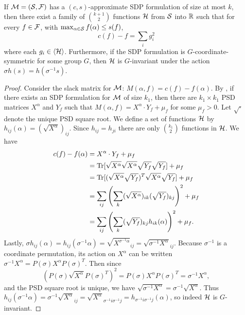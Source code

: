 \begin{lemma}\label{lem:sdptosos}
If $\mathcal M = (\mathcal S, \mathcal F)$ has a $(c,s)$-approximate SDP formulation of size at most $k$, then there exist a family of $\binom{k+1}{2}$ functions $\mathcal H$ from $\mathcal S$ into $\mathbb R$ such that for every $f \in \mathcal F$, with $\max_{\alpha \in \mathcal S} f(\alpha) \leq s(f)$,
\[c(f) - f = \sum_i g_i^2\]
where each $g_i \in \langle \mathcal H \rangle$. Furthermore, if the SDP formulation is $G$-coordinate-symmetric for some group $G$, then $\mathcal H$ is $G$-invariant under the action $\sigma h(s) = h(\sigma^{-1}s)$.
\end{lemma} 
\begin{proof}
Consider the slack matrix for $\mathcal M$: $M(\alpha,f) = c(f) - f(\alpha)$. By , if there exists an SDP formulation for $\mathcal M$ of size $k_1$, then there are $k_1 \times k_1$ PSD matrices $X^\alpha$ and $Y_f$ such that $M(\alpha,f) = X^\alpha \cdot Y_f + \mu_f$ for some $\mu_f > 0$. Let $\sqrt{\cdot}$ denote the unique PSD square root. We define a set of functions $\mathcal H$ by $h_{ij}(\alpha) = (\sqrt{X^\alpha})_{ij}$. Since $h_{ij} = h_{ji}$ there are only $\binom{k_1}{2}$ functions in $\mathcal H$. We have
\begin{align*}
c(f) - f(\alpha) &= X^\alpha \cdot Y_f + \mu_f \\
&= \operatorname{Tr}[\sqrt{X^\alpha}\sqrt{X^\alpha}\sqrt{Y_f}\sqrt{Y_f}] + \mu_f \\
&= \operatorname{Tr}[(\sqrt{X^\alpha}\sqrt{Y_f})^T\sqrt{X^\alpha}\sqrt{Y_f}] + \mu_f \\
&= \sum_{ij} \left(\sum_k (\sqrt{X^\alpha})_{ik}(\sqrt{Y_f})_{kj}\right)^2 + \mu_f \\
&= \sum_{ij} \left(\sum_k (\sqrt{Y_f})_{kj}h_{ik}(\alpha)\right)^2 + \mu_f.
\end{align*}
Lastly, $\sigma h_{ij}(\alpha) = h_{ij}(\sigma^{-1}\alpha) = \sqrt{X^{\sigma^{-1}\alpha}}_{ij} = \sqrt{\sigma^{-1}X^\alpha}_{ij}$. Because $\sigma^{-1}$ is a coordinate permutation, its action on $X^\alpha$ can be written $\sigma^{-1} X^\alpha = P(\sigma) X^\alpha P(\sigma)^T$. Then since 
\[\left(P(\sigma)\sqrt{X^\alpha}P(\sigma)^T\right)^2 = P(\sigma)X^\alpha P(\sigma)^T = \sigma^{-1}X^\alpha,\] 
and the PSD square root is unique, we have $\sqrt{\sigma^{-1}X^\alpha} = \sigma^{-1}\sqrt{X^\alpha}$. Thus $h_{ij}(\sigma^{-1}\alpha) = \sigma^{-1}\sqrt{X^\alpha}_{ij} = \sqrt{X^\alpha}_{\sigma^{-1}i\sigma^{-1}j} = h_{\sigma^{-1}i\sigma^{-1}j}(\alpha)$, so indeed $\mathcal H$ is $G$-invariant. 
\end{proof}

